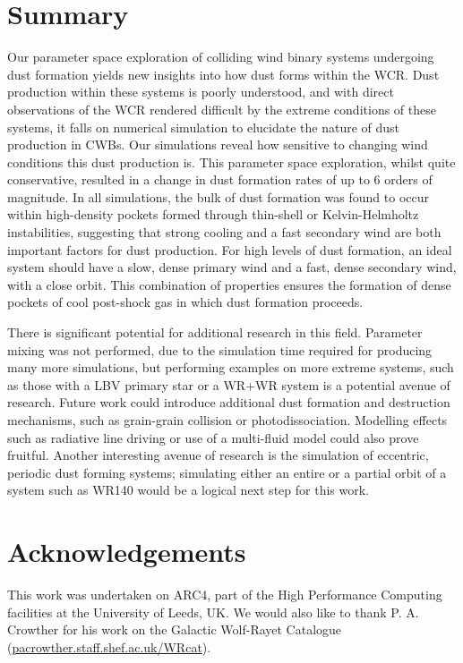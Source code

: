 \documentclass[fleqn,usenatbib]{mnras}
\begin{document}
\section{Summary}

Our parameter space exploration of colliding wind binary systems undergoing dust formation yields new insights into how dust forms within the WCR.
Dust production within these systems is poorly understood, and with direct observations of the WCR rendered difficult by the extreme conditions of these systems, it falls on numerical simulation to elucidate the nature of dust production in CWBs.
Our simulations reveal how sensitive to changing wind conditions this dust production is.
This parameter space exploration, whilst quite conservative, resulted in a change in dust formation rates of up to 6 orders of magnitude.
In all simulations, the bulk of dust formation was found to occur within high-density pockets formed through thin-shell or Kelvin-Helmholtz instabilities, suggesting that strong cooling and a fast secondary wind are both important factors for dust production.
For high levels of dust formation, an ideal system should have a slow, dense primary wind and a fast, dense secondary wind, with a close orbit.
This combination of properties ensures the formation of dense pockets of cool post-shock gas in which dust formation proceeds.

There is significant potential for additional research in this field.
Parameter mixing was not performed, due to the simulation time required for producing many more simulations, but performing examples on more extreme systems, such as those with a LBV primary star or a WR+WR system is a potential avenue of research.
Future work could introduce additional dust formation and destruction mechanisms, such as grain-grain collision or photodissociation.
Modelling effects such as radiative line driving or use of a multi-fluid model could also prove fruitful. 
Another interesting avenue of research is the simulation of eccentric, periodic dust forming systems; simulating either an entire or a partial orbit of a system such as WR140 would be a logical next step for this work.

\section{Acknowledgements}

This work was undertaken on ARC4, part of the High Performance Computing facilities at the University of Leeds, UK.
We would also like to thank P. A. Crowther for his work on the Galactic Wolf-Rayet Catalogue (\url{pacrowther.staff.shef.ac.uk/WRcat}).





\bsp	%
\label{lastpage}
\end{document}
